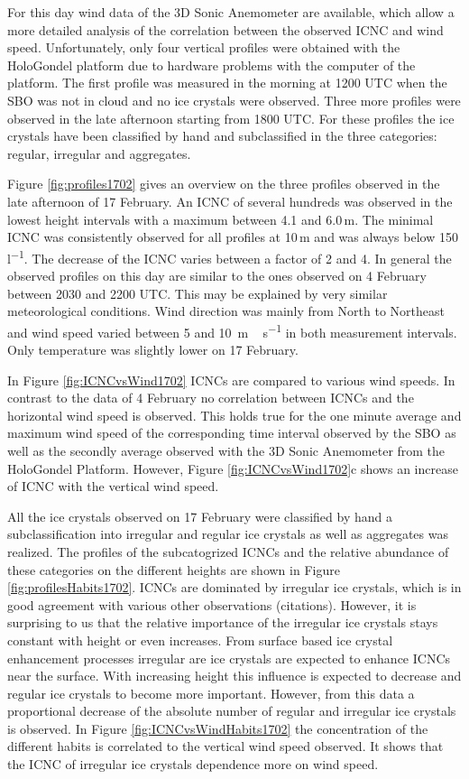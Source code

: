 \documentclass[draft,linenumbers]{agujournal}
\begin{document}
For this day wind data of the 3D Sonic Anemometer are available, which allow a more detailed analysis of the correlation between the observed ICNC and wind speed. Unfortunately, only four vertical profiles were obtained with the HoloGondel platform due to hardware problems with the computer of the platform. The first profile was measured in the morning at 1200 UTC when the SBO was not in cloud and no ice crystals were observed. Three more profiles were observed in the late afternoon starting from 1800 UTC. For these profiles the ice crystals have been classified by hand and subclassified in the three categories: regular, irregular and aggregates.

Figure \ref{fig:profiles1702} gives an overview on the three profiles observed in the late afternoon of 17 February. An ICNC of several hundreds was observed in the lowest height intervals with a maximum between 4.1 and 6.0\,\si{m}. The minimal ICNC was consistently observed for all profiles at 10\,\si{m} and was always below 150\,\si{l^{-1}}. The decrease of the ICNC varies between a factor of 2 and 4. In general the observed profiles on this day are similar to the ones observed on 4 February between 2030 and 2200 UTC. This may be explained by very similar meteorological conditions. Wind direction was mainly from North to Northeast and wind speed varied between 5 and 10 \,\si{m\,s^{-1}} in both measurement intervals. Only temperature was slightly lower on 17 February.

In Figure \ref{fig:ICNCvsWind1702} ICNCs are compared to various wind speeds. In contrast to the data of 4 February no correlation between ICNCs and the horizontal wind speed is observed. This holds true for the one minute average and maximum wind speed of the corresponding time interval observed by the SBO as well as the secondly average observed with the 3D Sonic Anemometer from the HoloGondel Platform. However, Figure \ref{fig:ICNCvsWind1702}c shows an increase of ICNC with the vertical wind speed. 

All the ice crystals observed on 17 February were classified by hand a subclassification into irregular and regular ice crystals as well as aggregates was realized. The profiles of the subcatogrized ICNCs and the relative abundance of these categories on the different heights are shown in Figure \ref{fig:profilesHabits1702}. ICNCs are dominated by irregular ice crystals, which is in good agreement with various other observations (citations). However, it is surprising to us that the relative importance of the irregular ice crystals stays constant with height or even increases. From surface based ice crystal enhancement processes irregular are ice crystals are expected to enhance ICNCs near the surface. With increasing height this influence is expected to decrease and regular ice crystals to become more important. However, from this data a proportional decrease of the absolute number of regular and irregular ice crystals is observed. In Figure \ref{fig:ICNCvsWindHabits1702} the concentration of the different habits is correlated to the vertical wind speed observed. It shows that the ICNC of irregular ice crystals dependence more on wind speed. 
\end{document}
